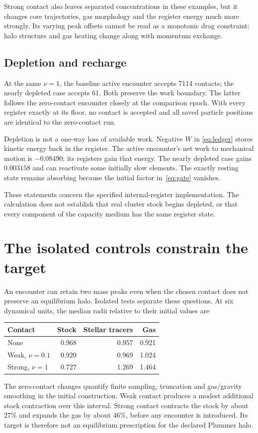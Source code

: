 \documentclass[11pt]{article}
\begin{document}
Strong contact also leaves separated concentrations in these examples, but
it changes core trajectories, gas morphology and the register energy much
more strongly. Its varying peak offsets cannot be read as a monotonic drag
constraint: halo structure and gas heating change along with momentum exchange.

\subsection{Depletion and recharge}
At the same $\nu=1$, the baseline active encounter accepts 7114 contacts;
the nearly depleted case accepts 61. Both preserve the work boundary.
The latter follows the zero-contact encounter closely at the comparison epoch.
With every register exactly at its floor, no contact is accepted and all
saved particle positions are identical to the zero-contact run.

Depletion is not a one-way loss of available work. Negative $W$ in
\eqref{eq:ledger} stores kinetic energy back in the register. The active
encounter's net work to mechanical motion is $-0.08490$; its registers gain
that energy. The nearly depleted case gains $0.003158$ and can reactivate
some initially slow elements. The exactly resting state remains absorbing
because the initial factor in~\eqref{eq:gate} vanishes.

These statements concern the specified internal-register implementation.
The calculation does not establish that real cluster stock begins depleted,
or that every component of the capacity medium has the same register state.

\section{The isolated controls constrain the target}
An encounter can retain two mass peaks even when the chosen contact does
not preserve an equilibrium halo. Isolated tests separate these questions.
At six dynamical units, the median radii relative to their initial values are
\begin{center}
\begin{tabular}{@{}lrrr@{}}
\toprule
Contact & Stock & Stellar tracers & Gas\\
\midrule
None & 0.968 & 0.957 & 0.921\\
Weak, $\nu=0.1$ & 0.920 & 0.969 & 1.024\\
Strong, $\nu=1$ & 0.727 & 1.269 & 1.464\\
\bottomrule
\end{tabular}
\end{center}
The zero-contact changes quantify finite sampling, truncation and gas/gravity
smoothing in the initial construction. Weak contact produces a modest additional
stock contraction over this interval. Strong contact contracts the stock by
about $27\%$ and expands the gas by about $46\%$, before any encounter is
introduced. Its target is therefore not an equilibrium prescription for the
declared Plummer halo.
\end{document}
